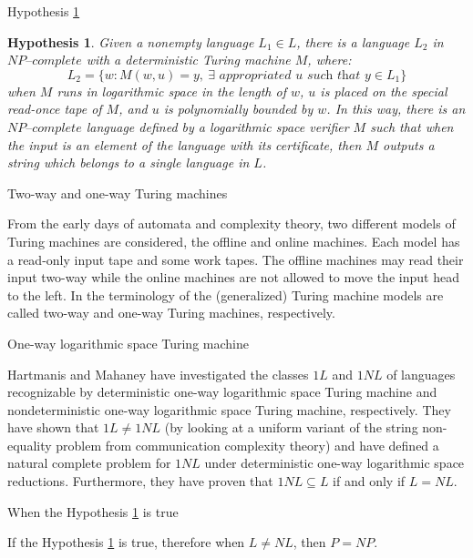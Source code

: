\documentclass[11pt]{beamer}
\newtheorem{hypothesis}[theorem]{Hypothesis}
\begin{document}
\begin{frame}{Hypothesis \ref{hypothesis1}}

\begin{hypothesis}
\label{hypothesis1}
Given a nonempty language $L_{1} \in L$, there is a language $L_{2}$ in $\textit{NP--complete}$ with a deterministic Turing machine $M$, where:
\[L_{2} = \{w: M(w, u) = y, \ \exists \textit{ appropriated } u \textit{ such that } y \in L_{1}\}\]
when $M$ runs in logarithmic space in the length of $w$, $u$ is placed on the special read-once tape of $M$, and $u$ is polynomially bounded by $w$. In this way, there is an $\textit{NP--complete}$ language defined by a logarithmic space verifier $M$ such that when the input is an element of the language with its certificate, then $M$ outputs a string which belongs to a single language in $L$.
\end{hypothesis}

\end{frame}

\begin{frame}{Two-way and one-way Turing machines}

From the early days of automata and complexity  theory,  two  different  models  of  Turing  machines  are  considered, the offline and online machines. Each model has a read-only input tape and some work tapes. The offline machines may read their input two-way while the online machines are not allowed to move the input head to the left. In the terminology of the (generalized) Turing machine models are called two-way and one-way Turing machines, respectively.

\end{frame}

\begin{frame}{One-way logarithmic space Turing machine}

Hartmanis and Mahaney have investigated the classes $1L$ and $1NL$ of languages recognizable by deterministic one-way logarithmic space Turing machine and nondeterministic one-way logarithmic space Turing machine, respectively. They have shown that $1L \neq 1NL$ (by looking at a uniform variant of the string non-equality problem from communication complexity theory) and have defined a natural complete problem for $1NL$ under deterministic one-way logarithmic space reductions. Furthermore, they have proven that $1NL \subseteq L$ if and only if $L=NL$.

\end{frame}

\begin{frame}{When the Hypothesis \ref{hypothesis1} is true}

\begin{theorem}
\label{neg-implication}
If the Hypothesis \ref{hypothesis1} is true, therefore when $L \neq NL$, then $P = NP$.
\end{theorem}

\end{frame}
\end{document}
